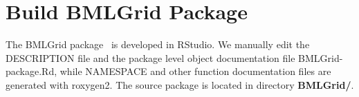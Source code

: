 \documentclass[twocolumn]{article}
\begin{document}
\section{Build BMLGrid Package}
The BMLGrid package~\cite{wu2015bmlgrid} is developed in RStudio. We manually
edit the DESCRIPTION file and the package level object documentation file
BMLGrid-package.Rd, while NAMESPACE and other function
documentation files are generated with roxygen2. The source package is located
in directory \textbf{BMLGrid/}.





\end{document}

